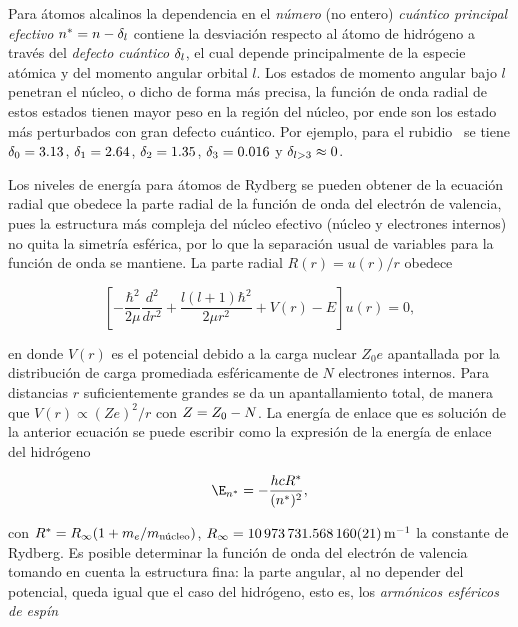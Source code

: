 \p Para átomos alcalinos la dependencia en el \emph{número} (no entero) \emph{cuántico principal efectivo} $n^{*}=n-\delta_\sm{l}$ contiene la desviación respecto al átomo de hidrógeno a través del \emph{defecto cuántico} $\delta_ \sm{l}$, el cual depende principalmente de la especie atómica y del momento angular orbital $l$. Los estados de momento angular bajo $l$ penetran el núcleo, o dicho de forma más precisa, la función de onda radial de estos estados tienen mayor peso en la región del núcleo, por ende son los estado más perturbados con gran defecto cuántico. Por ejemplo, para el rubidio~\cite{low} se tiene $\delta_\sm{0}=3.13$, $\delta_\sm{1}=2.64$, $\delta_\sm{2}=1.35$, $\delta_\sm{3}=0.016$ y $\delta_\sm{l>3}\approx0$.

\p Los niveles de energía para átomos de Rydberg se pueden obtener de la ecuación radial que obedece la parte radial de la función de onda del electrón de valencia, pues la estructura más compleja del núcleo efectivo (núcleo y electrones internos) no quita la simetría esférica, por lo que la separación usual de variables para la función de onda se mantiene. La parte radial $R(r)=u(r)/r$ obedece

\begin{equation}
\label{ec:funcionOndaRadial}
\left[-\frac{\hbar^{2}}{2\mu}\frac{d^{2}}{dr^{2}}+\frac{l(l+1)\hbar^{2}}{2\mu r^{2}}+V(r)-E\right]u(r)=0,
\end{equation}

en donde $V(r)$ es el potencial debido a la carga nuclear $Z_{0}e$ apantallada por la distribución de carga promediada esféricamente de $N$ electrones internos. Para distancias $r$ suficientemente grandes se da un apantallamiento total, de manera que $V(r)\propto(Ze)^{2}/r$ con $Z=Z_\sm{0}-N$. La energía de enlace que es solución de la anterior ecuación se puede escribir como la expresión de la energía de enlace del hidrógeno

\begin{equation}
\label{ec:energiaEnlace}
\E_\sm{n^{*}}=-\frac{hcR^{*}}{(n^{*})^{2}},
\end{equation}

con $R^{*}=R_\sm{\infty}(1+m_\sm{e}/m_\sm{\text{núcleo}})$, $R_\sm{\infty}=\SI{10973731.568160(21)}{\per\meter}$ la constante de Rydberg. Es posible determinar la función de onda del electrón de valencia tomando en cuenta la estructura fina: la parte angular, al no depender del potencial, queda igual que el caso del hidrógeno, esto es, los \emph{armónicos esféricos de espín}~\cite{cohen}

